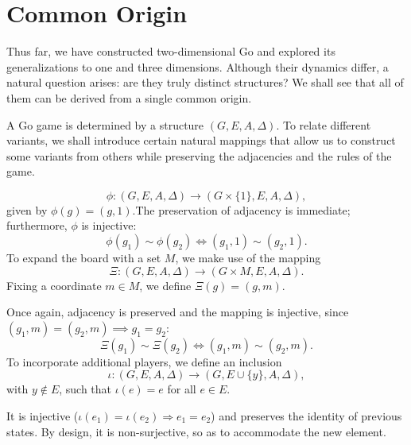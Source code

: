 \section{Common Origin}

Thus far, we have constructed two-dimensional Go and explored its generalizations to one and three dimensions. Although their dynamics differ, a natural question arises: are they truly distinct structures? We shall see that all of them can be derived from a single common origin.

A Go game is determined by a structure \((G,E,A,\Delta)\). To relate different variants, we shall introduce certain natural mappings that allow us to construct some variants from others while preserving the adjacencies and the rules of the game.

$$\phi:(G,E,A,\Delta)\to(G\times\{1\},E,A,\Delta),$$given by $\phi(g)=(g,1)$.The preservation of adjacency is immediate; furthermore, $\phi$ is injective:
$$\phi(g_1)\sim\phi(g_2)\iff(g_1,1)\sim(g_2,1).$$
To expand the board with a set $M$, we make use of the mapping
$$\Xi:(G,E,A,\Delta)\to(G\times M,E,A,\Delta).$$
Fixing a coordinate $m \in M$, we define $\Xi(g) = (g,m)$.

Once again, adjacency is preserved and the mapping is injective, since $(g_1,m) = (g_2,m) \implies g_1 = g_2$:$$\Xi(g_1) \sim \Xi(g_2) \iff (g_1,m) \sim (g_2,m).$$To incorporate additional players, we define an inclusion
$$\iota: (G,E,A,\Delta) \to (G,E \cup \{y\},A,\Delta),$$
with $y \notin E$, such that $\iota(e) = e$ for all $e \in E$.

It is injective ($\iota(e_1) = \iota(e_2) \Rightarrow e_1 = e_2$) and preserves the identity of previous states. By design, it is non-surjective, so as to accommodate the new element.


